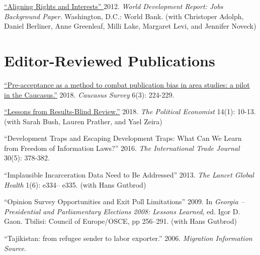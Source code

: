 \documentclass[margin,line]{res}
\begin{document}
{\begin{resume}
\begin{etaremune}
\item \href{http://siteresources.worldbank.org/EXTNWDR2013/Resources/8258024-1320950747192/8260293-1320956712276/8261091-1348683883703/WDR2013_bp_Aligning_Rights_and_Incentives.pdf}{``Aligning Rights and
Interests'' } 2012. \emph{World
  Development Report: Jobs Background Paper}. Washington, D.C.: World
Bank. (with Christoper Adolph, Daniel Berliner, Anne
Greenleaf, Milli Lake, Margaret Levi, and Jennifer Noveck)
\end{etaremune}


\section{\sc  Editor-Reviewed Publications}

\renewcommand{\labelenumi}{O\theenumi.}

\begin{etaremune}
\item \href{https://doi.org/10.1080/23761199.2018.1522796}{``Pre-acceptance as a method to combat publication bias in area studies: a pilot in the Caucasus.''} 2018.  \emph{Caucasus Survey} 6(3): 224-229.
    
\item \href{https://docs.google.com/viewer?a=v&pid=sites&srcid=dW1pY2guZWR1fHBvbGl0aWNhbC1lY29ub21pc3QtbmV3c2xldHRlcnxneDoxZjU3NWI4ZjgyMjNmN2M4}{``Lessons from Results-Blind Review.''} 2018.  \emph{The
    Political Economist} 14(1): 10-13. (with Sarah Bush, Lauren Prather, and Yael Zeira)

 \item ``Development Traps and Escaping Development Traps: What Can We
  Learn from Freedom of Information Laws?'' 2016. \emph{The
    International Trade Journal } 30(5): 378-382.

 \item  ``Implausible Incarceration Data Need to Be Addressed''
  2013. \emph{The Lancet Global Health} 1(6): e334-- e335. (with Hans
  Gutbrod)

 \item  ``Opinion Survey Opportunities and Exit Poll Limitations'' 2009. In
  \emph{Georgia -- Presidential and Parliamentary Elections 2008:
    Lessons Learned}, ed. Igor D. Gaon. Tbilisi: Council of
  Europe/OSCE, pp 256--291. (with Hans Gutbrod)

\item  ``Tajikistan: from refugee sender to labor exporter.''
  2006. \emph{Migration Information Source}.
\end{etaremune}


\end{resume}}
\end{document}

